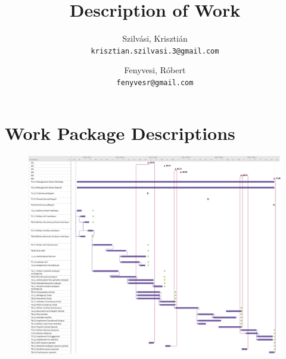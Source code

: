 \documentclass[11 pt,a4paper,english]{article}
\title{Description of Work}
\author{
	Szilvási, Krisztián\\
	\texttt{krisztian.szilvasi.3@gmail.com}
	\and
	Fenyvesi, Róbert\\
	\texttt{fenyvesr@gmail.com}
}
\begin{document}
\maketitle

\newpage



\tableofcontents

\newpage



\newpage





\newpage



\newpage



\newpage

\section{Work Package Descriptions}


\newpage


\newpage


\newpage


\newpage


\newpage


\newpage


\newpage


\newpage



\newpage\begin{figure}
	\centering
	\includegraphics[width=1\linewidth, height=1\textheight]{Gantt_chart}
	\label{fig:ganttchart}
\end{figure}






\newpage

\printglossaries
\end{document}
